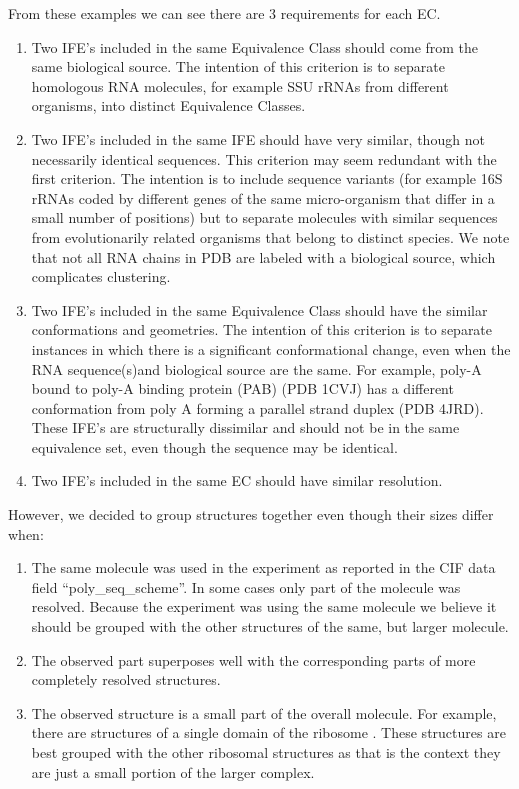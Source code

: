 From these examples we can see there are 3 requirements for each EC.
\begin{enumerate}
  \item Two IFE’s included in the same Equivalence Class should come from the
    same biological source. The intention of this criterion is to separate
    homologous RNA molecules, for example SSU rRNAs from different organisms,
    into distinct Equivalence Classes.

  \item Two IFE’s included in the same IFE should have very similar, though not
    necessarily identical sequences. This criterion may seem redundant with the
    first criterion. The intention is to include sequence variants (for example
    16S rRNAs coded by different genes of the same micro-organism that differ in
    a small number of positions) but to separate molecules with similar
    sequences from evolutionarily related organisms that belong to distinct
    species. We note that not all RNA chains in PDB are labeled with a
    biological source, which complicates clustering.

  \item Two IFE’s included in the same Equivalence Class should have the similar
    conformations and geometries. The intention of this criterion is to separate
    instances in which there is a significant conformational change, even when
    the RNA sequence(s)and biological source  are the same. For example, poly-A
    bound to poly-A binding protein (PAB) (PDB 1CVJ) has a different
    conformation from poly A forming a parallel strand duplex (PDB 4JRD). These
    IFE’s are structurally dissimilar and should not be in the same equivalence
    set, even though the sequence may be identical.

  \item Two IFE’s included in the same EC should have similar resolution.
\end{enumerate}

However, we decided to group structures together even though their sizes differ
when:

\begin{enumerate}
  \item The same molecule was used in the experiment as reported in the CIF data
    field ``poly\_seq\_scheme''. In some cases only part of the molecule was
    resolved. Because the experiment was using the same molecule we believe it
    should be grouped with the other structures of the same, but larger
    molecule.

  \item The observed part superposes well with the corresponding parts of more
    completely resolved structures.

  \item The observed structure is a small part of the overall molecule. For
    example, there are structures of a single domain of the ribosome
    \cite{Nissen2000}. These structures are best grouped with the other
    ribosomal structures as that is the context they are just a small portion of
    the larger complex.
\end{enumerate}

